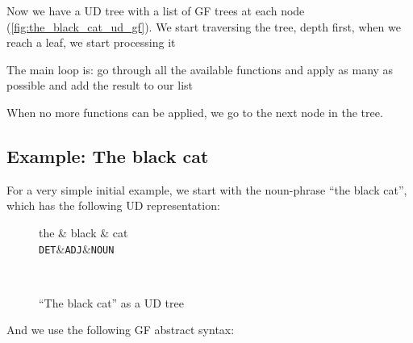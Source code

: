 Now we have a UD tree with a list of GF trees at each node (\autoref{fig:the_black_cat_ud_gf}). We start traversing the tree, depth first, when we reach a leaf, we start processing it

The main loop is: go through all the available functions and apply as many as possible and add the result to our list

When no more functions can be applied, we go to the next node in the tree.

\subsection{Example: The black cat}

For a very simple initial example, we start with the noun-phrase ``the black cat'', which has the following UD representation:

\begin{figure}[H]
    \centering
    \setlength{\unitlength}{0.2mm}
    \begin{dependency}
        \begin{deptext}[column sep=0.4cm]
              the \& black \& cat \\
            {\tt DET}\&{\tt ADJ}\&{\tt NOUN}\\
        \end{deptext}
    \end{dependency} \\
    \caption{``The black cat'' as a UD tree}
    \label{fig:the_black_cat_ud}
\end{figure}

And we use the following GF abstract syntax:


